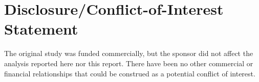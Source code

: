 \section*{Disclosure/Conflict-of-Interest Statement}
The original study was funded commercially, but the sponsor did not affect the analysis reported here nor this report. There have been no other commercial or financial relationships that could be construed as a potential conflict of interest. 